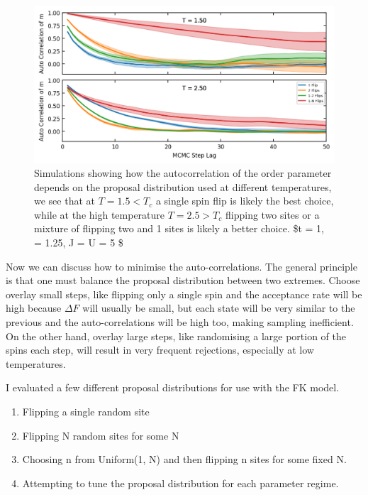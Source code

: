 \begin{figure}
\hypertarget{fig:autocorr_multiple_proposals}{%
\centering
\includegraphics[width=1\textwidth,height=\textheight]{figure_code/fk_chapter/lsr/figs/autocorr_multiple_proposals.png}
\caption[no title]{Simulations showing how the autocorrelation of the order
parameter depends on the proposal distribution used at different
temperatures, we see that at \(T = 1.5 < T_c\) a single spin flip is
likely the best choice, while at the high temperature \(T = 2.5 > T_c\)
flipping two sites or a mixture of flipping two and 1 sites is likely a
better choice. \$t = 1, \alpha = 1.25, J = U = 5
\$}\label{fig:autocorr_multiple_proposals}
}
\end{figure}

Now we can discuss how to minimise the auto-correlations. The general principle is that one must balance the proposal distribution between two extremes. Choose overlay small steps, like flipping only a single spin and the acceptance rate will be high because \(\Delta F\) will usually be small, but each state will be very similar to the previous and the auto-correlations will be high too, making sampling inefficient. On the other hand, overlay large steps, like randomising a large portion of the spins each step, will result in very frequent rejections, especially at low temperatures.

I evaluated a few different proposal distributions for use with the FK model.

\begin{enumerate}
\def\labelenumi{\arabic{enumi}.}
\tightlist
\item
  Flipping a single random site
\item
  Flipping N random sites for some N
\item
  Choosing n from Uniform(1, N) and then flipping n sites for some fixed N.
\item
  Attempting to tune the proposal distribution for each parameter regime.
\end{enumerate}

